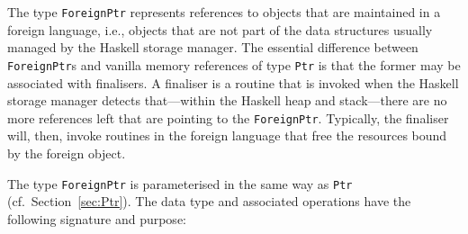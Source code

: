 \documentclass[a4paper,twosides]{article}
\newcommand{\code}[1]{\texttt{#1}}      %
\begin{document}
The type \code{ForeignPtr} represents references to objects that are
maintained in a foreign language, i.e., objects that are not part of the data
structures usually managed by the Haskell storage manager. The essential
difference between \code{ForeignPtr}s and vanilla memory references of type
\code{Ptr} is that the former may be associated with finalisers.  A finaliser
is a routine that is invoked when the Haskell storage manager detects
that---within the Haskell heap and stack---there are no more references left
that are pointing to the \code{ForeignPtr}.  Typically, the finaliser will,
then, invoke routines in the foreign language that free the resources bound by
the foreign object.  

The type \code{ForeignPtr} is parameterised in the same way as \code{Ptr}
(cf.\ Section~\ref{sec:Ptr}).  The data type and associated operations have
the following signature and purpose:
%
\end{document}
